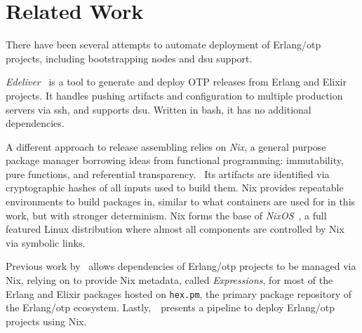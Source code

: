 \cleardoublepage
\section{Related Work}\label{sec:related_work}

There have been several attempts to automate deployment of Erlang/\acrshort{otp} projects, including bootstrapping nodes and \acrshort{dsu} support.

\emph{Edeliver}~\cite{edeliver,talk:edeliver} is a tool to generate and deploy OTP releases from Erlang and Elixir projects. It handles pushing artifacts and configuration to multiple production servers via \acrshort{ssh}, and supports \acrshort{dsu}. Written in bash, it has no additional dependencies. 


A different approach to release assembling relies on \emph{Nix}, a general purpose package manager borrowing ideas from functional programming: immutability, pure functions, and referential transparency.~\cite{nix1} Its artifacts are identified via cryptographic hashes of all inputs used to build them. Nix provides repeatable environments to build packages in, similar to what containers are used for in this work, but with stronger determinism. Nix forms the base of \emph{NixOS}~\cite{nixos}, a full featured Linux distribution where almost all components are controlled by Nix via symbolic links.

Previous work by~\cite{erlangnix} allows dependencies of Erlang/\acrshort{otp} projects to be managed via Nix, relying on \cite{hex2nix} to provide Nix metadata, called \emph{Expressions}, for most of the Erlang and Elixir packages hosted on \lstinline|hex.pm|, the primary package repository of the Erlang/\acrshort{otp} ecosystem. Lastly,~\cite{erlangnix2}~presents a pipeline to deploy Erlang/\acrshort{otp} projects using Nix.
